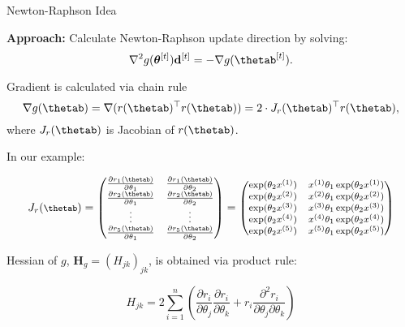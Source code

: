 \documentclass[11pt,compress,t,notes=noshow, xcolor=table]{beamer}
\begin{document}
\begin{vbframe}{Newton-Raphson Idea}


\textbf{Approach:} Calculate Newton-Raphson update direction by solving:
\begin{equation*}
    \nabla^2 g(\bm{\theta}^{[t]}) \mathbf{d}^{[t]} = - \nabla g(\thetab^{[t]}).
\end{equation*}

Gradient is calculated via chain rule
\begin{equation*}
    \nabla g(\thetab) = \nabla (r(\thetab)^\top r(\thetab)) = 2 \cdot J_r(\thetab)^\top r(\thetab),
\end{equation*}
where $J_r(\thetab)$ is Jacobian of $r(\thetab)$.

\lz

In our example:

\begin{equation*}
    \footnotesize
    J_r(\thetab) = \mat{
        \frac{\partial r_1(\thetab)}{\partial \theta_1} & \frac{\partial r_1(\thetab)}{\partial \theta_2} \\
        \frac{\partial r_2(\thetab)}{\partial \theta_1} & \frac{\partial r_2(\thetab)}{\partial \theta_2} \\
        \vdots & \vdots \\
        \frac{\partial r_5(\thetab)}{\partial \theta_1} & \frac{\partial r_5(\thetab)}{\partial \theta_2}
        } = \mat{
            \exp(\theta_2 x^{(1)}) & x^{(1)} \theta_ 1 \exp(\theta_2 x^{(1)}) \\
            \exp(\theta_2 x^{(2)}) & x^{(2)} \theta_ 1 \exp(\theta_2 x^{(2)})\\ \exp(\theta_2 x^{(3)}) & x^{(3)} \theta_1 \exp(\theta_2 x^{(3)}) \\
            \exp(\theta_2 x^{(4)}) & x^{(4)} \theta_1 \exp(\theta_2 x^{(4)}) \\ \exp(\theta_2 x^{(5)}) & x^{(5)} \theta_1 \exp(\theta_2 x^{(5)})
        }
\end{equation*}

\framebreak 

Hessian of $g$, $\mathbf{H}_g = (H_{jk})_{jk}$, is obtained via product rule:

\begin{equation*}
	H_{jk} = 2 \sum_{i=1}^n \left(\frac{\partial r_i}{\partial \theta_j}\frac{\partial r_i}{\partial \theta_k} + r_i \frac{\partial^2 r_i}{\partial \theta_j \partial \theta_k}\right)
\end{equation*}


\end{vbframe}
\end{document}
